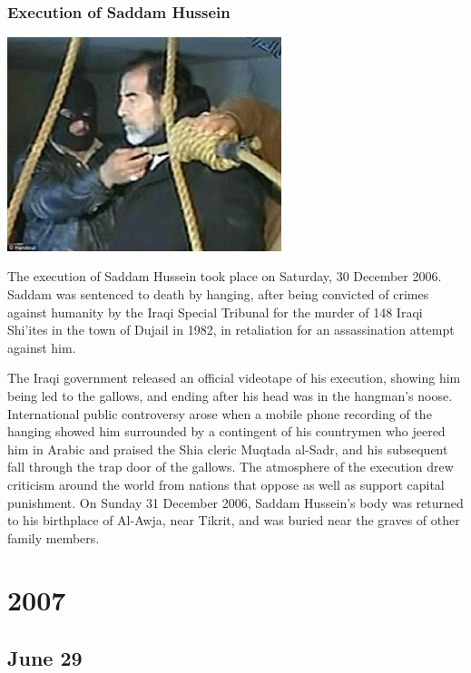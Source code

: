 \documentclass[11pt]{report}
\begin{document}
\subsection{Execution of Saddam Hussein}
\vspace{2mm}\begin{center}\includegraphics[width=8cm]{./img/saddamhusseinexec.jpg}\end{center}
The execution of Saddam Hussein took place on Saturday, 30 December 2006. Saddam was sentenced to death by hanging, after being convicted of crimes against humanity by the Iraqi Special Tribunal for the murder of 148 Iraqi Shi'ites in the town of Dujail in 1982, in retaliation for an assassination attempt against him.

The Iraqi government released an official videotape of his execution, showing him being led to the gallows, and ending after his head was in the hangman's noose. International public controversy arose when a mobile phone recording of the hanging showed him surrounded by a contingent of his countrymen who jeered him in Arabic and praised the Shia cleric Muqtada al-Sadr, and his subsequent fall through the trap door of the gallows. The atmosphere of the execution drew criticism around the world from nations that oppose as well as support capital punishment. On Sunday 31 December 2006, Saddam Hussein's body was returned to his birthplace of Al-Awja, near Tikrit, and was buried near the graves of other family members.

\chapter{2007}
\section{June 29}
\end{document}

